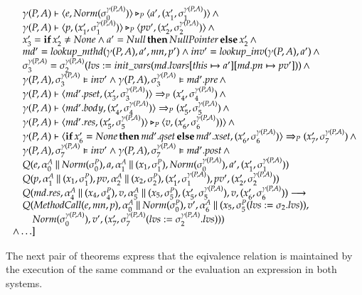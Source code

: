 \documentclass[a4paper,10pt]{article}
\begin{document}
\begin{displaymath}
\begin{array}{l}
\quad \gamma(P,A) \vdash \langle e,Norm(\sigma_0^{\gamma(P,A)}) \rangle \triangleright_P \langle a',(x'_1,\sigma_1^{\gamma(P,A)}) \rangle \,\wedge\\
\quad \gamma(P,A) \vdash \langle p, (x'_1, \sigma_1^{\gamma(P,A)}) \rangle \triangleright_P \langle pv', (x'_2, \sigma_2^{\gamma(P,A)}) \rangle \,\wedge\\
\quad x'_3 = \textbf{if}\, x'_2 \neq None \wedge a' = Null\, \textbf{then}\, NullPointer\, \textbf{else}\, x'_2 \,\wedge\\
\quad md' = lookup\_mthd(\gamma(P,A), a', mn, p') \wedge inv' = lookup\_inv(\gamma(P,A), a') \,\wedge\\
\quad \sigma^{\gamma(P,A)}_3 = \sigma^{\gamma(P,A)}_2(lvs:=init\_vars(md.lvars[this \mapsto a'][md.pn \mapsto pv']))
\,\wedge\\
\quad \gamma(P,A), \sigma^{\gamma(P,A)}_3 \vDash inv' \wedge \gamma(P,A), \sigma^{\gamma(P,A)}_3 \vDash md'.pre \,\wedge\\
\quad \gamma(P,A) \vdash \langle md'.pset, (x'_3, \sigma^{\gamma(P,A)}_3) \rangle \Rightarrow_P (x'_4, \sigma^{\gamma(P,A)}_4) \,\wedge\\
\quad \gamma(P,A) \vdash \langle md'.body, (x'_4, \sigma^{\gamma(P,A)}_4) \rangle \Rightarrow_P (x'_5, \sigma^{\gamma(P,A)}_5) \,\wedge\\
\quad \gamma(P,A) \vdash \langle md'.res, (x'_5, \sigma^{\gamma(P,A)}_5) \rangle \triangleright_P \langle v,(x'_6, \sigma^{\gamma(P,A)}_6)) \rangle \,\wedge\\
\quad \gamma(P,A) \vdash \langle \textbf{if}\, x'_6 = None\, \textbf{then}\, md'.qset\, \textbf{else}\, md'.xset, (x'_6, \sigma^{\gamma(P,A)}_6) \rangle \Rightarrow_P (x'_7, \sigma^{\gamma(P,A)}_7) \,\wedge\\
\quad \gamma(P,A), \sigma^{\gamma(P,A)}_7 \vDash inv' \wedge \gamma(P,A), \sigma^{\gamma(P,A)}_7 \vDash md'.post \,\wedge\\
\quad Q(e, \alpha_0^A \mathbin{\|} Norm(\sigma_0^P), a, \alpha_1^A \mathbin{\|} (x_1,\sigma_1^P), Norm(\sigma_0^{\gamma(P,A)}), a', (x'_1,\sigma_1^{\gamma(P,A)}))\\
\quad Q(p, \alpha^A_1 \mathbin{\|} (x_1, \sigma_1^P), pv, \alpha^A_2 \mathbin{\|} (x_2, \sigma^P_2), (x'_1, \sigma_1^{\gamma(P,A)}), pv',
(x'_2, \sigma_2^{\gamma(P,A)}))\\
\quad Q(md.res, \alpha^A_4 \mathbin{\|} (x_4, \sigma^P_4), v, \alpha^A_5 \mathbin{\|} (x_5, \sigma^P_5), (x'_5,
\sigma^{\gamma(P,A)}_5), v, (x'_6, \sigma^{\gamma(P,A)}_6)) \longrightarrow\\
\quad Q(MethodCall(e,mn,p), \alpha_0^A \mathbin{\|} Norm(\sigma_0^P), v', \alpha^A_6 \mathbin{\|} (x_5, \sigma^P_5(lvs:=\sigma_2.lvs)),\\
\quad\quad Norm(\sigma_0^{\gamma(P,A)}), v', (x'_7, \sigma^{\gamma(P,A)}_7(lvs:=\sigma^{\gamma(P,A)}_2.lvs)))\\
\wedge \ldots \rbrack
\end{array}
\end{displaymath}


\medskip
The next pair of theorems express that the eqivalence relation is maintained by the execution of the
same command or the evaluation an expression in both systems.
\end{document}
